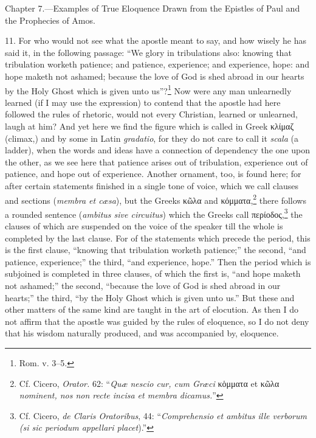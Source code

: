 
Chapter 7.—Examples of True Eloquence Drawn from the Epistles of Paul and the Prophecies of Amos.

11. For who would not see what the apostle meant to say, and how wisely he has said it, in the following passage: “We glory in tribulations also: knowing that tribulation worketh patience; and patience, experience; and experience, hope: and hope maketh not ashamed; because the love of God is shed abroad in our hearts by the Holy Ghost which is given unto us”?\footnote{Rom. v. 3–5.} Now were any man unlearnedly learned (if I may use the expression) to contend that the apostle had here followed the rules of rhetoric, would not every Christian, learned or unlearned, laugh  at him? And yet here we find the figure which is called in Greek \textgreek{κλίμαζ} (climax,) and by some in Latin \emph{gradatio}, for they do not care to call it \emph{ scala} (a ladder), when the words and ideas have a connection of dependency the one upon the other, as we see here that patience arises out of tribulation, experience out of patience, and hope out of experience. Another ornament, too, is found here; for after certain statements finished in a single tone of voice, which we call clauses and sections (\emph{membra et cæsa}), but the Greeks \textgreek{κῶλα} and \textgreek{κόμματα},\footnote{Cf. Cicero, \emph{Orator.} 62: “\emph{Quæ nescio cur, cum Græci} \textgreek{κὁμματα} et \textgreek{κῶλα} \emph{nominent, nos non recte incisa et membra dicamus.}”} there follows a rounded sentence (\emph{ambitus sive circuitus}) which the Greeks call \textgreek{περίοδος},\footnote{Cf. Cicero, \emph{de Claris Oratoribus}, 44: “\emph{Comprehensio et ambitus ille verborum (si sic periodum appellari placet}).”} the clauses of which are suspended on the voice of the speaker till the whole is completed by the last clause. For of the statements which precede the period, this is the first clause, “knowing that tribulation worketh patience;” the second, “and patience, experience;” the third, “and experience, hope.” Then the period which is subjoined is completed in three clauses, of which the first is, “and hope maketh not ashamed;” the second, “because the love of God is shed abroad in our hearts;” the third, “by the Holy Ghost which is given unto us.” But these and other matters of the same kind are taught in the art of elocution. As then I do not affirm that the apostle was guided by the rules of eloquence, so I do not deny that his wisdom naturally produced, and was accompanied by, eloquence.

